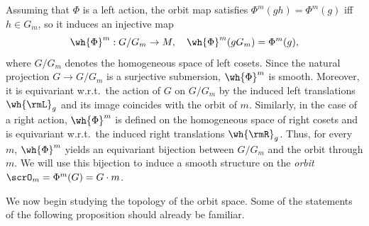 Assuming that $\Phi$ is a left action, the orbit map satisfies $\Phi^m(gh)=\Phi^m(g)$ iff $h\in G_m$, so it induces an injective map
\[\wh{\Phi}^m:G\slash G_m\to M,\quad \wh{\Phi}^m(g G_m)=\Phi^m(g),\label{eq 6.1.8 RS1}\]
where $G\slash G_m$ denotes the homogeneous space of left cosets. Since the natural projection $G\to G\slash G_m$ is a surjective submersion, $\wh{\Phi}^m$ is smooth. Moreover, it is equivariant w.r.t.\ the action of $G$ on $G\slash G_m$ by the induced left translations $\wh{\rmL}_g$ and its image coincides with the orbit of $m$. Similarly, in the case of a right action, $\wh{\Phi}^m$ is defined on the homogeneous space of right cosets and is equivariant w.r.t.\ the induced right translations $\wh{\rmR}_g$. Thus, for every $m$, $\wh{\Phi}^m$ yields an equivariant bijection between $G\slash G_m$ and the orbit through $m$. We will use this bijection to induce a smooth structure on the \emph{orbit} $\scrO_m=\Phi^m(G)=G\cdot m$.

We now begin studying the topology of the orbit space. Some of the statements of the following proposition should already be familiar.


